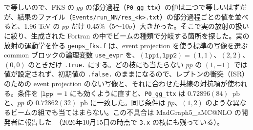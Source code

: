 \documentclass[a4paper,10pt]{ltjsarticle}
\begin{document}
で等しいので、FKS の $gg$ の部分過程（\texttt{P0\_gg\_ttx}）の値は二つで等しいはずだが、結果のファイル（\texttt{Events/run\_NN/res\_<k>.txt}）の部分過程ごとの値を並べると、1.96 TeV の $p\bar p$ だけ $0.45\%$（$5$〜$10\sigma$）大きかった。そこで実の放射の扱いに絞り、生成された Fortran の中でビームの種類で分岐する箇所を探した。実の放射の運動学を作る \texttt{genps\_fks.f} は、event projection を使う標準の写像を選ぶ common ブロックの論理変数 \texttt{use\_evpr} を、$(\texttt{lpp1},\texttt{lpp2})=(1,1)$、$(2,2)$、$(0,0)$ のときだけ \texttt{.true.} にする。どの枝にも当たらない $p\bar p$ の $(1,-1)$ では値が設定されず、初期値の \texttt{.false.} のままになるので、レプトンの衝突（ISR）のための event projection のない写像と、それに合わせた共線の対抗項が使われる。条件を $|\texttt{lpp}|=1$ にも効くように直すと、\texttt{P0\_gg\_ttx} は $0.72896(84)$~pb と、$pp$ の $0.72862(32)$~pb に一致した。同じ条件は $\bar pp$、$(1,2)$ のような異なるビームの組でも当てはまらない。この不具合は MadGraph5\_aMC@NLO の開発者に報告した~\cite{mg5issue}（2026年10月15日の時点で \texttt{3.x} の枝にも残っている）。
\end{document}
